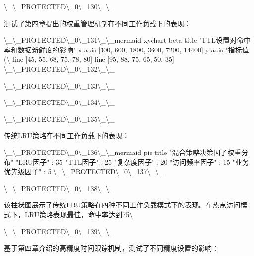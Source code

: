 \textbackslash{}_\textbackslash{}_PROTECTED\textbackslash{}_0\textbackslash{}_130\textbackslash{}_\textbackslash{}_

测试了第四章提出的权重管理机制在不同工作负载下的表现：

\textbackslash{}_\textbackslash{}_PROTECTED\textbackslash{}_0\textbackslash{}_131\textbackslash{}_\textbackslash{}_mermaid
xychart-beta
    title "TTL设置对命中率和数据新鲜度的影响"
    x-axis [300, 600, 1800, 3600, 7200, 14400]
    y-axis "指标值(\textbackslash{}%
    line [45, 55, 68, 75, 78, 80]
    line [95, 88, 75, 65, 50, 35]
\textbackslash{}_\textbackslash{}_PROTECTED\textbackslash{}_0\textbackslash{}_132\textbackslash{}_\textbackslash{}_

\textbackslash{}_\textbackslash{}_PROTECTED\textbackslash{}_0\textbackslash{}_133\textbackslash{}_\textbackslash{}_

\textbackslash{}_\textbackslash{}_PROTECTED\textbackslash{}_0\textbackslash{}_134\textbackslash{}_\textbackslash{}_

\textbackslash{}_\textbackslash{}_PROTECTED\textbackslash{}_0\textbackslash{}_135\textbackslash{}_\textbackslash{}_

传统LRU策略在不同工作负载下的表现：

\textbackslash{}_\textbackslash{}_PROTECTED\textbackslash{}_0\textbackslash{}_136\textbackslash{}_\textbackslash{}_mermaid
pie title "混合策略决策因子权重分布"
    "LRU因子" : 35
    "TTL因子" : 25
    "复杂度因子" : 20
    "访问频率因子" : 15
    "业务优先级因子" : 5
\textbackslash{}_\textbackslash{}_PROTECTED\textbackslash{}_0\textbackslash{}_137\textbackslash{}_\textbackslash{}_

\textbackslash{}_\textbackslash{}_PROTECTED\textbackslash{}_0\textbackslash{}_138\textbackslash{}_\textbackslash{}_

该柱状图展示了传统LRU策略在四种不同工作负载模式下的表现。在热点访问模式下，LRU策略表现最佳，命中率达到75\textbackslash{}%

\textbackslash{}_\textbackslash{}_PROTECTED\textbackslash{}_0\textbackslash{}_139\textbackslash{}_\textbackslash{}_

基于第四章介绍的高精度时间跟踪机制，测试了不同精度设置的影响：

